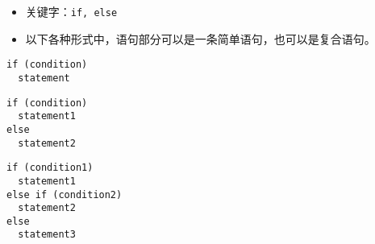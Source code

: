 \begin{frame}[fragile]
\begin{itemize}
\item 关键字：\lstinline|if, else| \\[0.1in]
\item 以下各种形式中，语句部分可以是一条简单语句，也可以是复合语句。
\end{itemize}
\end{frame}

\begin{frame}[fragile]
\begin{lstlisting}[]
if (condition)
  statement
\end{lstlisting}

\begin{lstlisting}[]
if (condition)
  statement1
else
  statement2  
\end{lstlisting}

\begin{lstlisting}[]
if (condition1)
  statement1
else if (condition2)
  statement2  
else
  statement3
\end{lstlisting}
\end{frame}

